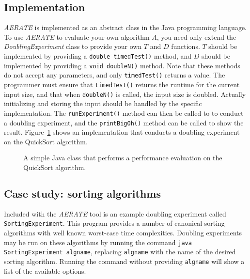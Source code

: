 \documentclass[10pt,twocolumn]{article}
\begin{document}
    \subsection{Implementation}
    \textit{AERATE} is implemented as an abstract class in the Java
    programming language.  To use \textit{AERATE} to evaluate your own
    algorithm $A$, you need only extend the \textit{DoublingExperiment}
    class to provide your own $T$ and $D$ functions.  $T$ should be
    implemented by providing a \lstinline$double timedTest()$ method, and $D$
    should be implemented by providing a \lstinline$void doubleN()$
    method. Note that these methods do not accept any parameters,
    and only \lstinline$timedTest()$ returns a value. The programmer
    must ensure that \lstinline$timedTest()$ returns the runtime for the
    current input size, and that when \lstinline$doubleN()$ is called,
    the input size is doubled.  Actually initializing and storing the
    input should be handled by the specific implementation. The
    \lstinline$runExperiment()$ method can then be called to to conduct
    a doubling experiment, and the \lstinline$printBigOh()$ method can
    be called to show the result. Figure~\ref{fig:qsprogram} shows an
    implementation that conducts a doubling experiment on the QuickSort
    algorithm.


    
    \begin{figure}[h!]
    
    \caption{A simple Java class that performs a performance evaluation
    on the QuickSort algorithm.}
    \label{fig:qsprogram}
    \end{figure}
    \subsection{Case study: sorting algorithms}
    \lstset{language=bash}
    Included with the \textit{AERATE} tool is an example doubling
    experiment called \texttt{SortingExperiment}.  This program provides a number
    of canonical sorting algorithms with well known worst-case time
    complexities.  Doubling experiments may be run on these algorithms
    by running the command \texttt{java SortingExperiment algname},
    replacing \texttt{algname} with the name of the desired sorting
    algorithm. Running the command without providing \texttt{algname}
    will show a list of the available options.
\end{document}
